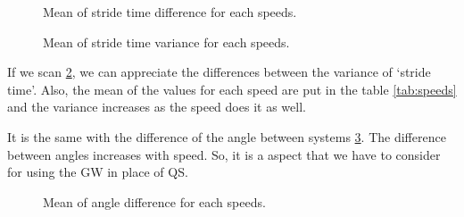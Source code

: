 \begin{figure}[H]
	\centering
	\caption{Mean of stride time difference for each speeds.}
	\label{fig:speed_stride_time}
\end{figure}

\begin{figure}[H]
	\centering
	\caption{Mean of stride time variance for each speeds.}
	\label{fig:speed_var_stride_time}
\end{figure}

If we scan \ref{fig:speed_var_stride_time}, we can appreciate the differences between the variance of ‘stride time’. Also, the mean of the values for each speed are put in the table \ref{tab:speeds} and the variance increases as the speed does it as well.

It is the same with the difference of the angle between systems \ref{fig:speed_angle}. The difference between angles increases with speed. So, it is a aspect that we have to consider for using the GW in place of QS.

\begin{figure}[H]
	\centering
	\caption{Mean of angle difference for each speeds.}
	\label{fig:speed_angle}
\end{figure}


